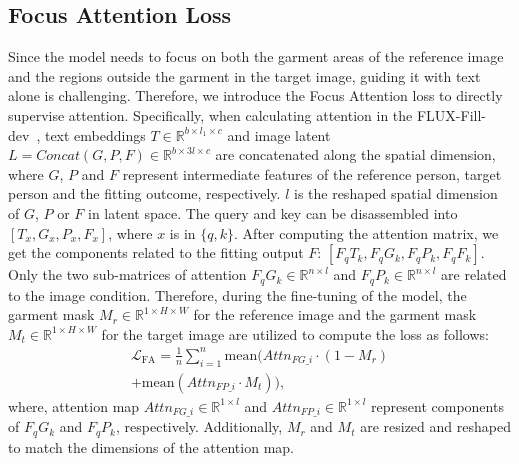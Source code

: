 \subsection{Focus Attention Loss}\label{sec:training_loss}
Since the model needs to focus on both the garment areas of the reference image and the regions outside the garment in the target image, guiding it with text alone is challenging. Therefore, we introduce the Focus Attention loss to directly supervise attention. Specifically, when calculating attention in the FLUX-Fill-dev~\cite{flux}, text embeddings $T\in\mathbb{R}^{b\times l_1\times c}$ and image latent $L=Concat\left(G, P, F\right)\in\mathbb{R}^{b\times 3l\times c}$ are concatenated along the spatial dimension, where $G$, $P$ and $F$ represent intermediate features of the reference person, target person and the fitting outcome, respectively. $l$ is the reshaped spatial dimension of $G$, $P$ or $F$ in latent space.
The query and key can be disassembled into $\left[T_x, G_x, P_x,F_x\right]$, where $x$ is in $\{q, k\}$. After computing the attention matrix, we get the components related to the fitting output $F$: $\left[F_qT_k, F_qG_k, F_qP_k, F_qF_k\right]$. Only the two sub-matrices of attention $F_qG_k\in\mathbb{R}^{n\times l}$ and $F_qP_k\in\mathbb{R}^{n\times l}$ are related to the image condition. Therefore, during the fine-tuning of the model, the garment mask $M_r\in\mathbb{R}^{1\times H\times W}$ for the reference image and the garment mask $M_t\in\mathbb{R}^{1\times H\times W}$ for the target image are utilized to compute the loss as follows:
\begin{equation}
\begin{array}{rcl}
\mathcal{L}_{\mathrm{FA}}=\frac{1}{n}\sum_{i=1}^{n}\mathrm{mean}(Attn_{FG\_i}\cdot (1-M_r) \\ +\mathrm{mean}(Attn_{FP\_i}\cdot M_t)), 
\end{array}
\end{equation}
where, attention map $Attn_{FG\_i}\in\mathbb{R}^{1\times l}$ and $Attn_{FP\_i}\in\mathbb{R}^{1\times l}$ represent components of $F_qG_k$ and $F_qP_k$, respectively. Additionally, $M_r$ and $M_t$ are resized and reshaped to match the dimensions of the attention map.



